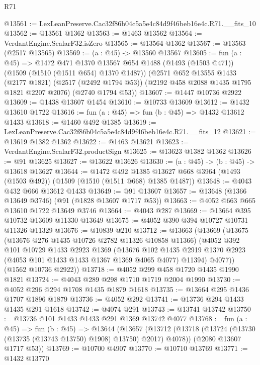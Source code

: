 \begin{lexlean}{R71}
\begin{coremodule}
@13561 := LexLeanPreserve.Cac32f86b04c5a5e4c84d9f46beb16e4c.R71.__fits_10
@13562 := @13561 @1362
@13563 := @1463 @13562
@13564 := VerdantEngine.ScalarF32.isZero
@13565 := @13564 @1362
@13567 := @13563 (@2517 @13565)
@13569 := (a : @45) -> @13560 @13567
@13605 := fun (a : @45) =>
  @1472
    @471
    @1370
    @13567
    @654
    @1488
    (@1493 (@1503 @471))
    (@1509 (@1510 (@1511 @654) @1370 @1487))
    (@2571
      @652
      @13555
      @1433
      (@2177 @1821)
      (@2517 (@2492 @1794 @53))
      (@2192 @458 @2088 @1435 @1795 @1821 @2207 @2076)
      (@2740 @1794 @53))
@13607 := @1447 @10736 @2922
@13609 := @1438 @13607 @1454
@13610 := @10733 @13609
@13612 := @1432 @13610 @1722
@13616 := fun (a : @45) => fun (b : @45) => @1432 @13612 @1433
@13618 := @1460 @492 @1385
@13619 := LexLeanPreserve.Cac32f86b04c5a5e4c84d9f46beb16e4c.R71.__fits_12
@13621 := @13619 @1382 @1362
@13622 := @1463 @13621
@13623 := VerdantEngine.ScalarF32.productSign
@13625 := @13623 @1382 @1362
@13626 := @91 @13625
@13627 := @13622 @13626
@13630 := (a : @45) -> (b : @45) -> @13618 @13627
@13644 := @1472
    @492
    @1385
    @13627
    @668
    @3964
    (@1493 (@1503 @492))
    (@1509 (@1510 (@1511 @668) @1385 @1487))
@13648 := @4043 @432 @666 @13612 @1433
@13649 := @91 @13607
@13657 := @13648 (@1366 @13649 @3746) (@91 (@1828 @13607 @1717 @53))
@13663 := @4052 @663 @665 @13610 @1722 @13649 @3746
@13664 := @4043 @287
@13669 := @13664 @395 @10732 @13609 @11330 @13649
@13675 := @4052 @390 @394 @10727 @10731 @11326 @11329
@13676 := @10839 @210
@13712 := @13663
    (@13669
      (@13675
        (@13676 @276 @1435 @10726 @2782 @11326 @10858 @11366)
        (@4052
          @392
          @101
          @10729
          @1433
          @2923
          @1369
          (@13676
            @102
            @1435
            @2919
            @1370
            @2923
            (@4053 @101 @1433 @1433 @1367 @1369 @4065 @4077)
            @11394)
          @4077))
      (@1562 @10736 @2922))
@13718 := @4052 @299 @458 @1720 @1435 @1990 @1821
@13724 := @4043 @289 @298 @1710 @1719 @2004 @1990
@13730 := @4052 @296 @294 @1708 @1435 @1879 @1618
@13735 := @13664 @295 @1436 @1707 @1896 @1879
@13736 := @4052 @292
@13741 := @13736 @294 @1433 @1435 @291 @1618
@13742 := @4074 @291
@13743 := @13741 @13742
@13750 := @13736 @101 @1433 @1433 @291 @1369 @13742 @4077
@13768 := fun (a : @45) =>
  fun (b : @45) =>
  @13644
    (@13657
      (@13712 (@13718 (@13724 (@13730 (@13735 (@13743 @13750) @1908) @13750) @2017) @4078))
      (@2080 @13607 @1717 @53))
@13769 := @10700 @4907
@13770 := @10710 @13769
@13771 := @1432 @13770

\end{coremodule}
\end{lexlean}
